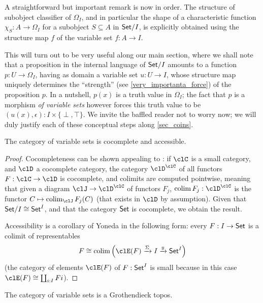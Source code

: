 \begin{remark}
	A straightforward but important remark is now in order. The structure of subobject classifier of $\Omega_I$, and in particular the shape of a characteristic function $\chi_S : A \to \Omega_I$ for a subobject $S\subseteq A$ in $\mathsf{Set}/I$, is explicitly obtained using the structure map $f$ of the variable set $f : A\to I$.

	This will turn out to be very useful along our main section, where we shall note that a proposition in the internal language of $\mathsf{Set}/I$ amounts to a function $p : U \to \Omega_I$, having as domain a variable set $u : U \to I$, whose structure map uniquely determines the ``strength'' (see \autoref{very_importanta_force}) of the proposition $p$. In a nutshell, $p(x)$ is a truth value in $\Omega_I$; the fact that $p$ is a morphism \emph{of variable sets} however forces this truth value to be $(u(x),\epsilon) : I\times \{\perp,\top\}$. We invite the baffled reader not to worry now; we will duly justify each of these conceptual steps along \autoref{sec_coins}.
\end{remark}
\begin{proposition}
	The category of variable sets is cocomplete and accessible.
\end{proposition}
\begin{proof}
	Cocompleteness can be shown appealing to \cite[??]{Bor1}: if $\clC$ is a small category, and $\clD$ a cocomplete category, the category $\clD^\clC$ of all functors $F : \clC \to \clD$ is cocomplete, and colimits are computed pointwise, meaning that given a diagram $\clJ \to \clD^\clC$ of functors $F_j$, $\colim F_j : \clD^\clC$ is the functor $C \mapsto \colim_\clJ F_j(C)$ (that exists in $\clD$ by assumption).
	Given that $\mathsf{Set}/I\cong \mathsf{Set}^I$, and that the category $\mathsf{Set}$ is cocomplete, we obtain the result.

	Accessibility is a corollary of Yoneda in the following form: every $F : I \to \mathsf{Set}$ is a colimit of representables
	\[
		F \cong \colim\Big(\clE(F) \xto{\Sigma} I \xto{y} \Set^I\Big)
	\]
	(the category of elements \cite{Bor1} $\clE(F)$ of $F:\mathsf{Set}^I$ is small because in this case $\clE(F)\cong\coprod_{i: I}Fi$).
\end{proof}
\begin{corollary}
	The category of variable sets is a Grothendieck topos.
\end{corollary}
